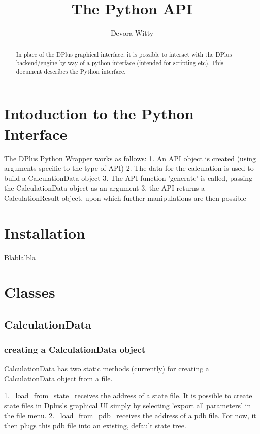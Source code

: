 \documentclass[12pt]{article}
\title{The Python API}
\author{Devora Witty}
\begin{document}
	
	\maketitle
	
	\begin{abstract}
		
		In place of the DPlus graphical interface, it is possible to interact with the DPlus backend/engine by way of a python interface (intended for scripting etc). This document describes the Python interface.
		
	\end{abstract}
	
	\section{Intoduction to the Python Interface}
	The DPlus Python Wrapper works as follows:
	1. An API object is created (using arguments specific to the type of API)
	2. The data for the calculation is used to build a CalculationData object
	3. The API function 'generate' is called, passing the CalculationData object as an argument
	3. the API returns a CalculationResult object, upon which further manipulations
	are then possible
	
	
	
	
	\section{Installation}
	Blablalbla
	
	\section{Classes}
	\subsection{CalculationData}
\subsubsection{creating a CalculationData object}
CalculationData has two static methods (currently) for
creating a CalculationData object from a file.

1. ~load_from_state~ receives the address of a state file. It is possible to create
state files in Dplus's graphical UI simply by selecting 'export all parameters'
in the file menu.
2. ~load_from_pdb~ receives the address of a pdb file. For now, it then plugs this pdb file
into an existing, default state tree.
\end{document}
